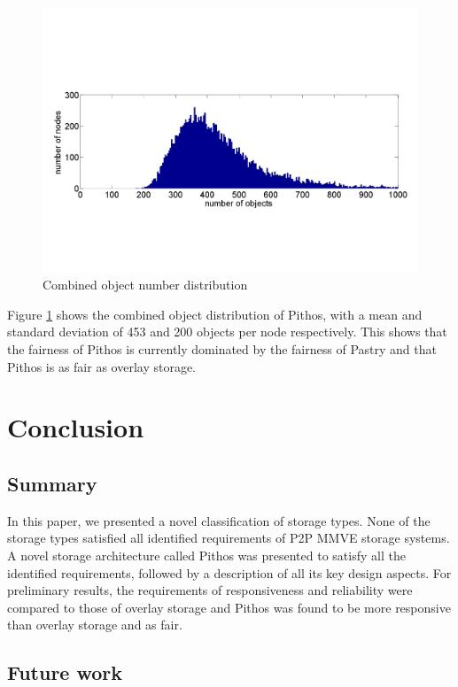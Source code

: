 \documentclass[10pt,a4paper,conference]{IEEEtran}
\begin{document}
\begin{figure}[htbp]
 \centering
 \includegraphics[clip=true, viewport=1cm 5cm 29cm 14.5cm, width=\columnwidth]{Objects}
 \caption{Combined object number distribution}
 \label{fig_objects}
\end{figure}
%
Figure \ref{fig_objects} shows the combined object distribution of Pithos, with a mean and standard deviation of 453 and 200 objects per node
respectively. This shows that the fairness of Pithos is currently dominated by the fairness of Pastry and that Pithos is as fair as overlay storage.

\section{Conclusion}
\label{conclusion}

\subsection{Summary}

In this paper, we presented a novel classification of storage types. None of the storage types satisfied all identified requirements of P2P MMVE
storage systems. A novel storage architecture called Pithos was presented to satisfy all the identified requirements, followed by a description of
all its key design aspects. For preliminary results, the requirements of responsiveness and reliability were compared to those of overlay storage and
Pithos was found to be more responsive than overlay storage and as fair.

\subsection{Future work}
\label{future_work}
\end{document}
